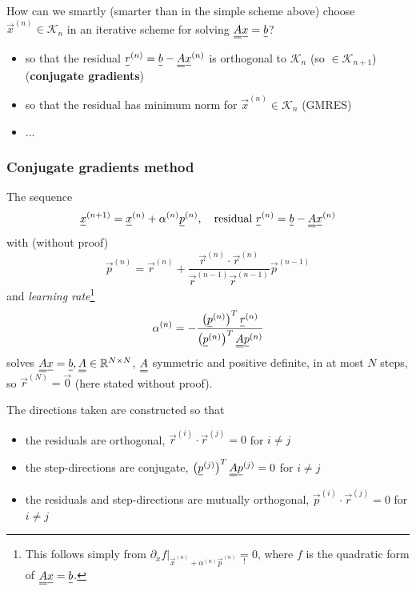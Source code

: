 How can we smartly (smarter than in the simple scheme above) choose $\vec{x}^{(n)} \in \mathcal{K}_n$ in an iterative scheme for solving $\mat{A}\vec{x} = \vec{b}$?
\begin{itemize}
    \item so that the residual $\vec{r}^{(n)} = \vec{b} - \mat{A}\vec{x}^{(n)}$ is orthogonal to $\mathcal{K}_n$ (so $\in \mathcal{K}_{n+1}$) (\textbf{conjugate gradients})
    \item so that the residual has minimum norm for $\vec{x}^{(n)} \in \mathcal{K}_n$ (GMRES)
    \item ...
\end{itemize}

\subsubsection{Conjugate gradients method}
The sequence
\begin{equation}
    \vec{x}^{(n+1)} = \vec{x}^{(n)} + \alpha^{(n)}\vec{p}^{(n)}, \quad \text{residual } \vec{r}^{(n)} = \vec{b} - \mat{A}\vec{x}^{(n)}
\end{equation}
with (without proof)
\begin{equation}
    \vec{p}^{(n)}=\vec{r}^{(n)}+\frac{\vec{r}^{(n)} \cdot \vec{r}^{(n)}}{\vec{r}^{(n-1)} \vec{r}^{(n-1)}} \vec{p}^{(n-1)}
\end{equation}
and \textit{learning rate}\footnote{This follows simply from $\left. \partial_x f \right|_{\vec{x}^{(n)} + \alpha^{(n)}\vec{p}^{(n)}} \underset{!}{=} 0$, where $f$ is the quadratic form of $\mat{A}\vec{x} = \vec{b}$.}
\begin{equation}
    \alpha^{(n)} = -\frac{\left(\vec{p}^{(n)} \right)^T \vec{r}^{(n)}}{\left(\vec{p}^{(n)} \right)^T \mat{A} \vec{p}^{(n)}}
\end{equation}
solves $\mat{A}\vec{x} = \vec{b}, \mat{A} \in \mathbb{R}^{N \times N}$, $\mat{A}$ symmetric
and positive definite, in at most $N$ steps, so $\vec{r}^{(N)} = \vec{0}$ (here stated without proof).

The directions taken are constructed so that
\begin{itemize}
    \item the residuals are orthogonal, $\vec{r}^{(i)} \cdot \vec{r}^{(j)} = 0$ for $i \ne j$
    \item the step-directions are conjugate, $\left(\vec{p}^{(j)} \right)^T \mat{A} \vec{p}^{(j)} = 0$ for $i \ne j$
    \item the residuals and step-directions are mutually orthogonal, $\vec{p}^{(i)} \cdot \vec{r}^{(j)} = 0$ for $i \ne j$
\end{itemize}

